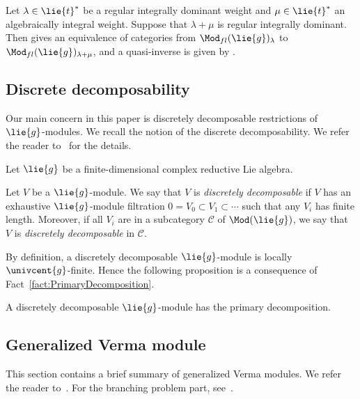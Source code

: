 \begin{Fact}\label{fact:TranslationEquvalence}
	Let $\lambda \in \lie{t}^*$ be a regular integrally dominant weight and $\mu \in \lie{t}^*$ an algebraically integral weight.
	Suppose that $\lambda + \mu$ is regular integrally dominant.
	Then  gives an equivalence of categories from $\Mod_{fl}(\lie{g})_{\lambda}$ to $\Mod_{fl}(\lie{g})_{\lambda + \mu}$, and a quasi-inverse is given by .
\end{Fact}

\subsection{Discrete decomposability}

Our main concern in this paper is discretely decomposable restrictions of $\lie{g}$-modules.
We recall the notion of the discrete decomposability.
We refer the reader to~\cite{Ko98_discrete_decomposable_3,Ko12_generalized_Verma} for the details.

Let $\lie{g}$ be a finite-dimensional complex reductive Lie algebra.

\begin{Definition}
	Let $V$ be a $\lie{g}$-module.
	We say that $V$ is \emph{discretely decomposable} if $V$ has an exhaustive $\lie{g}$-module filtration $0 = V_0\subset V_1 \subset \cdots $
	such that any $V_i$ has finite length.
	Moreover, if all $V_i$ are in a subcategory $\mathcal{C}$ of $\Mod(\lie{g})$, we say that $V$ is \emph{discretely decomposable} in $\mathcal{C}$.
\end{Definition}

By definition, a discretely decomposable $\lie{g}$-module is locally $\univcent{g}$-finite.
Hence the following proposition is a consequence of Fact~\ref{fact:PrimaryDecomposition}.

\begin{Proposition}
	A discretely decomposable $\lie{g}$-module has the primary decomposition.
\end{Proposition}

\subsection{Generalized Verma module}\label{subsect:GeneralizedVerme}

This section contains a brief summary of generalized Verma modules.
We refer the reader to~\cite{Hu08_category_o}.
For the branching problem part, see~\cite{Ko12_generalized_Verma}.

